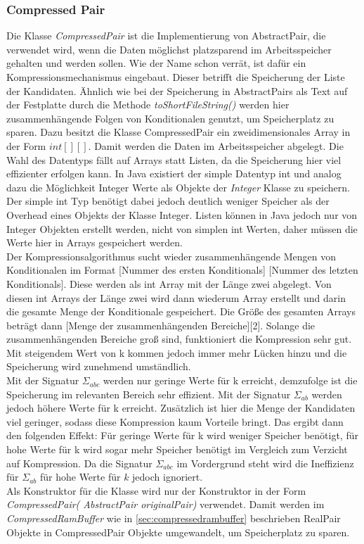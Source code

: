 \documentclass[12pt,a4paper]{article}
\begin{document}
\subsubsection{Compressed Pair}
Die Klasse  \textit{CompressedPair} ist die Implementierung von AbstractPair, die verwendet wird, wenn die Daten möglichst platzsparend im Arbeitsspeicher gehalten und werden sollen. Wie der Name schon verrät, ist dafür ein Kompressionsmechanismus eingebaut. Dieser betrifft die Speicherung der Liste der Kandidaten. Ähnlich wie bei der Speicherung in AbstractPairs als Text auf der Festplatte durch die Methode \textit{toShortFileString()} werden hier zusammenhängende Folgen von Konditionalen genutzt, um Speicherplatz zu sparen. Dazu besitzt die Klasse CompressedPair ein zweidimensionales Array in der Form $int[][]$. Damit werden die Daten im Arbeitsspeicher abgelegt. Die Wahl des Datentyps fällt auf Arrays statt Listen, da die Speicherung hier viel effizienter erfolgen kann. In Java existiert der simple Datentyp int und analog dazu die Möglichkeit Integer Werte als Objekte der \textit{Integer} Klasse zu speichern. Der simple int Typ benötigt dabei jedoch deutlich weniger Speicher als der Overhead eines Objekts der Klasse Integer. Listen können in Java jedoch nur von Integer Objekten erstellt werden, nicht von simplen int Werten, daher müssen die Werte hier in Arrays gespeichert werden.\\
Der Kompressionsalgorithmus sucht wieder zusammenhängende Mengen von Konditionalen im Format [Nummer des ersten Konditionals] [Nummer des letzten Konditionals]. Diese werden als int Array mit der Länge zwei abgelegt. Von diesen int Arrays der Länge zwei wird dann wiederum Array erstellt und darin die gesamte Menge der Konditionale gespeichert. Die Größe des gesamten Arrays beträgt dann [Menge der zusammenhängenden Bereiche][2]. Solange die zusammenhängenden Bereiche groß sind, funktioniert die Kompression sehr gut. Mit steigendem Wert von k kommen jedoch immer mehr Lücken hinzu und die Speicherung wird zunehmend umständlich. \\
Mit der Signatur $\Sigma_{abc}$ werden nur geringe Werte für k erreicht, demzufolge ist die Speicherung im relevanten Bereich sehr effizient. Mit der Signatur $\Sigma_{ab}$ werden jedoch höhere Werte für k erreicht. Zusätzlich ist hier die Menge der Kandidaten viel geringer, sodass diese Kompression kaum Vorteile bringt. Das ergibt dann den folgenden Effekt: Für geringe Werte für k wird weniger Speicher benötigt, für hohe Werte für k wird sogar mehr Speicher benötigt im Vergleich zum Verzicht auf Kompression. Da die Signatur $\Sigma_{abc}$ im Vordergrund steht wird die Ineffizienz für $\Sigma_{ab}$ für hohe Werte für $k$  jedoch ignoriert.\\
Als Konstruktor für die Klasse wird nur der Konstruktor in der Form \textit{CompressedPair( AbstractPair originalPair)} verwendet. Damit werden im \textit{CompressedRamBuffer} wie in \autoref{sec:compressedrambuffer} beschrieben RealPair Objekte in CompressedPair Objekte umgewandelt, um Speicherplatz zu sparen.
\end{document}
